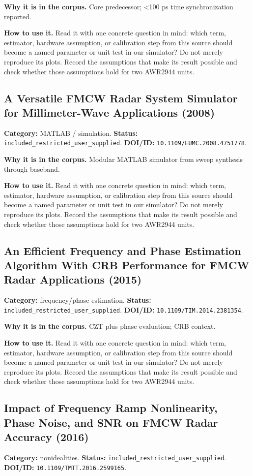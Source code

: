 \documentclass[11pt]{article}
\begin{document}
\textbf{Why it is in the corpus.} Core predecessor; <100 ps time synchronization reported.

\textbf{How to use it.} Read it with one concrete question in mind: which term, estimator, hardware assumption, or calibration step from this source should become a named parameter or unit test in our simulator? Do not merely reproduce its plots. Record the assumptions that make its result possible and check whether those assumptions hold for two AWR2944 units.

\subsection*{A Versatile FMCW Radar System Simulator for Millimeter-Wave Applications (2008)}
\textbf{Category:} MATLAB / simulation. \textbf{Status:} \nolinkurl{included_restricted_user_supplied}. \textbf{DOI/ID:} \nolinkurl{10.1109/EUMC.2008.4751778}.

\textbf{Why it is in the corpus.} Modular MATLAB simulator from sweep synthesis through baseband.

\textbf{How to use it.} Read it with one concrete question in mind: which term, estimator, hardware assumption, or calibration step from this source should become a named parameter or unit test in our simulator? Do not merely reproduce its plots. Record the assumptions that make its result possible and check whether those assumptions hold for two AWR2944 units.

\subsection*{An Efficient Frequency and Phase Estimation Algorithm With CRB Performance for FMCW Radar Applications (2015)}
\textbf{Category:} frequency/phase estimation. \textbf{Status:} \nolinkurl{included_restricted_user_supplied}. \textbf{DOI/ID:} \nolinkurl{10.1109/TIM.2014.2381354}.

\textbf{Why it is in the corpus.} CZT plus phase evaluation; CRB context.

\textbf{How to use it.} Read it with one concrete question in mind: which term, estimator, hardware assumption, or calibration step from this source should become a named parameter or unit test in our simulator? Do not merely reproduce its plots. Record the assumptions that make its result possible and check whether those assumptions hold for two AWR2944 units.

\subsection*{Impact of Frequency Ramp Nonlinearity, Phase Noise, and SNR on FMCW Radar Accuracy (2016)}
\textbf{Category:} nonidealities. \textbf{Status:} \nolinkurl{included_restricted_user_supplied}. \textbf{DOI/ID:} \nolinkurl{10.1109/TMTT.2016.2599165}.
\end{document}
